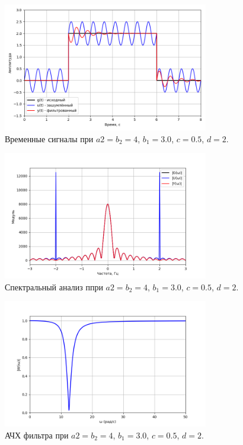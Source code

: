 \documentclass[a4paper]{article}
\begin{document}
\begin{figure}[H]
  \centering
  \includegraphics[width=0.8\textwidth]{src/task_1_2/5. time_157_3_0.5.png}
  \caption{Временные сигналы при $a2 = b_2 = 4$, $b_1=3.0$, $c=0.5$, $d=2$.}
\end{figure}
\begin{figure}[H]
  \centering
  \includegraphics[width=0.8\textwidth]{src/task_1_2/5. spec_157_3_0.5.png}
  \caption{Спектральный анализ ппри $a2 = b_2 = 4$, $b_1=3.0$, $c=0.5$, $d=2$.}
\end{figure}
\begin{figure}[H]
  \centering
  \includegraphics[width=0.8\textwidth]{src/task_1_2/5. ach_157_3_0.5.png}
  \caption{АЧХ фильтра при $a2 = b_2 = 4$, $b_1=3.0$, $c=0.5$, $d=2$.}
\end{figure}
\end{document}
